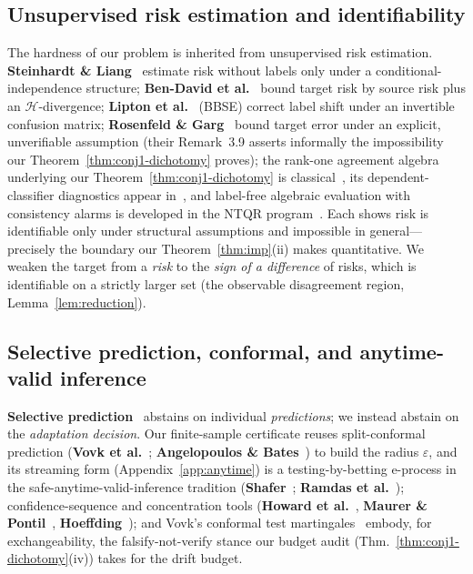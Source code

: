 \documentclass[conference]{IEEEtran}
\theoremstyle{plain}
\theoremstyle{definition}
\begin{document}
\subsection{Unsupervised risk estimation and identifiability}
The hardness of our problem is inherited from unsupervised risk estimation.
\textbf{Steinhardt \& Liang}~\cite{steinhardt2016} estimate risk without labels only under a conditional-independence
structure; \textbf{Ben-David et al.}~\cite{bendavid2010theory,bendavid2010impossibility} bound target risk by source risk plus an
$\mathcal{H}$-divergence; \textbf{Lipton et al.}~\cite{lipton2018bbse} (BBSE) correct label shift under an invertible
confusion matrix; \textbf{Rosenfeld \& Garg}~\cite{rosenfeld2023dis2} bound target error under an explicit,
unverifiable assumption (their Remark~3.9 asserts informally the impossibility our
Theorem~\ref{thm:conj1-dichotomy} proves); the rank-one agreement algebra underlying our
Theorem~\ref{thm:conj1-dichotomy} is classical~\cite{parisi2014,jaffe2015,platanios2014,ibrahim2019},
its dependent-classifier diagnostics appear in~\cite{jaffe2016}, and label-free
algebraic evaluation with consistency alarms is developed in the NTQR
program~\cite{corradaemmanuel2024}. Each shows risk is identifiable only under structural assumptions and
impossible in general---precisely the boundary our Theorem~\ref{thm:imp}(ii) makes
quantitative. We weaken the target from a \emph{risk} to the \emph{sign of a difference} of
risks, which is identifiable on a strictly larger set (the observable disagreement region,
Lemma~\ref{lem:reduction}).

\subsection{Selective prediction, conformal, and anytime-valid inference}
\textbf{Selective prediction}~\cite{geifman2017selective} abstains on individual \emph{predictions};
we instead abstain on the \emph{adaptation decision}. Our finite-sample certificate reuses
split-conformal prediction (\textbf{Vovk et al.}~\cite{vovk2005}; \textbf{Angelopoulos \& Bates}~\cite{angelopoulos2023}) to build the
radius $\varepsilon$, and its streaming form (Appendix~\ref{app:anytime}) is a
testing-by-betting e-process in the safe-anytime-valid-inference tradition (\textbf{Shafer}~\cite{shafer2021};
\textbf{Ramdas et al.}~\cite{ramdas2023}); confidence-sequence and concentration tools
(\textbf{Howard et al.}~\cite{howard2021timeuniform}, \textbf{Maurer \& Pontil}~\cite{maurer2009empirical},
\textbf{Hoeffding}~\cite{hoeffding1963probability}); and Vovk's conformal test martingales~\cite{vovk2021martingale}
embody, for exchangeability, the falsify-not-verify stance our budget audit
(Thm.~\ref{thm:conj1-dichotomy}(iv)) takes for the drift budget.
\end{document}
